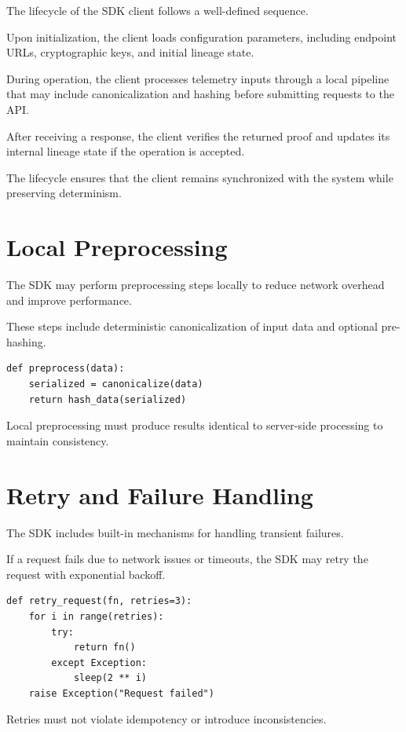 The lifecycle of the SDK client follows a well-defined sequence.

Upon initialization, the client loads configuration parameters, including endpoint URLs, cryptographic keys, and initial lineage state.

During operation, the client processes telemetry inputs through a local pipeline that may include canonicalization and hashing before submitting requests to the API.

After receiving a response, the client verifies the returned proof and updates its internal lineage state if the operation is accepted.

The lifecycle ensures that the client remains synchronized with the system while preserving determinism.

\section{Local Preprocessing}

The SDK may perform preprocessing steps locally to reduce network overhead and improve performance.

These steps include deterministic canonicalization of input data and optional pre-hashing.

\begin{verbatim}
def preprocess(data):
    serialized = canonicalize(data)
    return hash_data(serialized)
\end{verbatim}

Local preprocessing must produce results identical to server-side processing to maintain consistency.

\section{Retry and Failure Handling}

The SDK includes built-in mechanisms for handling transient failures.

If a request fails due to network issues or timeouts, the SDK may retry the request with exponential backoff.

\begin{verbatim}
def retry_request(fn, retries=3):
    for i in range(retries):
        try:
            return fn()
        except Exception:
            sleep(2 ** i)
    raise Exception("Request failed")
\end{verbatim}

Retries must not violate idempotency or introduce inconsistencies.

